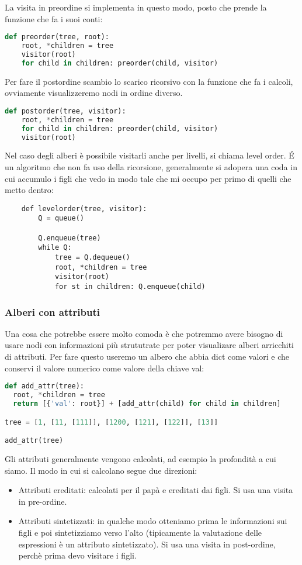 La visita in preordine si implementa in questo modo, posto che prende la funzione che fa i suoi conti:
\begin{lstlisting}[language=Python]
def preorder(tree, root):
    root, *children = tree
    visitor(root)
    for child in children: preorder(child, visitor)
\end{lstlisting}

Per fare il postordine scambio lo scarico ricorsivo con la funzione che fa i calcoli, ovviamente visualizzeremo nodi in ordine diverso.
\begin{lstlisting}[language=Python]
def postorder(tree, visitor):
    root, *children = tree
    for child in children: preorder(child, visitor)
    visitor(root)
\end{lstlisting}

Nel caso degli alberi è possibile visitarli anche per livelli, si chiama level order. \'E un algoritmo che non fa uso della ricorsione, generalmente si adopera una coda in cui accumulo i figli che vedo in modo tale che mi occupo per primo di quelli che metto dentro:

\begin{lstlisting}
    def levelorder(tree, visitor):
        Q = queue()

        Q.enqueue(tree)
        while Q:
            tree = Q.dequeue()
            root, *children = tree
            visitor(root)
            for st in children: Q.enqueue(child)
\end{lstlisting}

\subsubsection{Alberi con attributi}

Una cosa che potrebbe essere molto comoda è che potremmo avere bisogno di usare nodi con informazioni più strututrate per poter visualizare alberi arricchiti di attributi. Per fare questo useremo un albero che abbia dict come valori e che conservi il valore numerico come valore della chiave val:
\begin{lstlisting}[language=Python]
 def add_attr(tree):
  root, *children = tree
  return [{'val': root}] + [add_attr(child) for child in children]

tree = [1, [11, [111]], [1200, [121], [122]], [13]]

add_attr(tree)
\end{lstlisting} 

Gli attributi generalmente vengono calcolati, ad esempio la profondità a cui siamo. Il modo in cui si calcolano segue due direzioni:
\begin{itemize}
    \item Attributi ereditati: calcolati per il papà e ereditati dai figli. Si usa una visita in pre-ordine.
    \item Attributi sintetizzati: in qualche modo otteniamo prima le informazioni sui figli e poi sintetizziamo verso l'alto (tipicamente la valutazione delle espressioni è un attributo sintetizzato). Si usa una visita in post-ordine, perchè prima devo visitare i figli.
\end{itemize}


